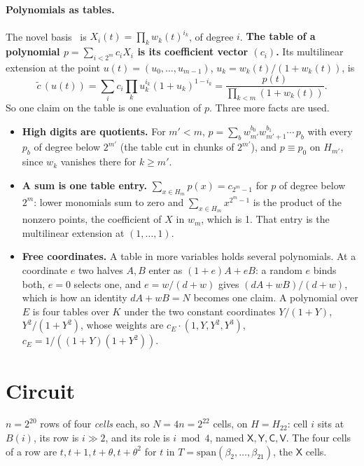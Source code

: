 \documentclass[11pt]{article}
\newcommand{\K}{K}
\newcommand{\E}{E}
\newcommand{\cells}{H}
\newcommand{\reps}{T}
\begin{document}
\paragraph{Polynomials as tables.} The novel basis~\cite{LCH14} is $X_i(t) = \prod_k w_k(t)^{i_k}$, of degree $i$. \textbf{The table of a polynomial $p = \sum_{i < 2^m} c_i X_i$ is its coefficient vector $(c_i)$.} Its multilinear extension at the point $u(t) = (u_0, \dots, u_{m-1})$, $u_k = w_k(t) / (1 + w_k(t))$, is
\begin{equation}\label{eq:uni}
  \widetilde{c}\,(u(t)) = \sum_i c_i \prod_k u_k^{i_k} (1 + u_k)^{1 - i_k} = \frac{p(t)}{\prod_{k < m} (1 + w_k(t))} .
\end{equation}
So one claim on the table is one evaluation of $p$. Three more facts are used.
\begin{itemize}
  \item \textbf{High digits are quotients.} For $m' < m$, $p = \sum_b w_{m'}^{b_0} w_{m'+1}^{b_1} \cdots\, p_b$ with every $p_b$ of degree below $2^{m'}$ (the table cut in chunks of $2^{m'}$), and $p \equiv p_0$ on $H_{m'}$, since $w_k$ vanishes there for $k \ge m'$.
  \item \textbf{A sum is one table entry.} $\sum_{x \in H_m} p(x) = c_{2^m - 1}$ for $p$ of degree below $2^m$: lower monomials sum to zero and $\sum_{x \in H_m} x^{2^m - 1}$ is the product of the nonzero points, the coefficient of $X$ in $w_m$, which is 1. That entry is the multilinear extension at $(1, \dots, 1)$.
  \item \textbf{Free coordinates.} A table in more variables holds several polynomials. At a coordinate $e$ two halves $A, B$ enter as $(1 + e) A + e B$: a random $e$ binds both, $e = 0$ selects one, and $e = w / (d + w)$ gives $(d A + w B) / (d + w)$, which is how an identity $d A + w B = N$ becomes one claim. A polynomial over $\E$ is four tables over $\K$ under the two constant coordinates $Y / (1 + Y)$, $Y^2 / (1 + Y^2)$, whose weights are $c_\E \cdot (1, Y, Y^2, Y^3)$, $c_\E = 1 / ((1 + Y)(1 + Y^2))$.
\end{itemize}

\section{Circuit}

$n = 2^{20}$ rows of four \emph{cells} each, so $N = 4n = 2^{22}$ cells, on $\cells = H_{22}$: cell $i$ sits at $B(i)$, its row is $i \gg 2$, and its role is $i \bmod 4$, named $\mathsf X, \mathsf Y, \mathsf C, \mathsf V$. The four cells of a row are $t, t + 1, t + \theta, t + \theta^2$ for $t$ in $\reps = \mathrm{span}(\beta_2, \dots, \beta_{21})$, the $\mathsf X$ cells.
\end{document}
